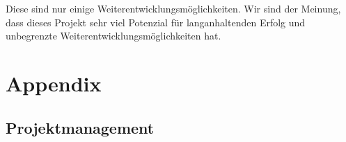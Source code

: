 \documentclass[11pt,ngerman]{article}
\begin{document}
	Diese sind nur einige Weiterentwicklungsmöglichkeiten. Wir sind der Meinung, dass dieses Projekt sehr viel Potenzial für langanhaltenden Erfolg und unbegrenzte Weiterentwicklungsmöglichkeiten hat.

    \section{Appendix}

    \subsection{Projektmanagement}
\end{document}
